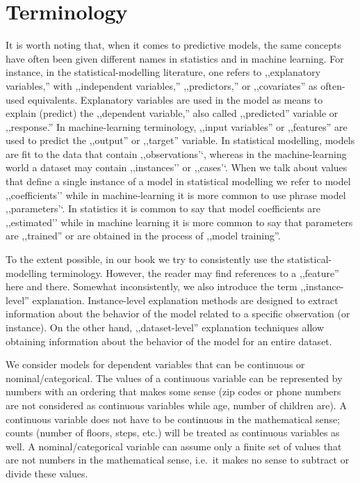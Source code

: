 \documentclass[]{krantz}
\begin{document}
\hypertarget{terminology}{%
\section{Terminology}\label{terminology}}

It is worth noting that, when it comes to predictive models, the same concepts have often been given different names in statistics and in machine learning. For instance, in the statistical-modelling literature, one refers to ,,explanatory variables,'' with ,,independent variables,'' ,,predictors,'' or ,,covariates'' as often-used equivalents. Explanatory variables are used in the model as means to explain (predict) the ,,dependent variable,'' also called ,,predicted'' variable or ,,response.'' In machine-learning terminology, ,,input variables'' or ,,features'' are used to predict the ,,output'' or ,,target'' variable. In statistical modelling, models are fit to the data that contain ,,observations'`, whereas in the machine-learning world a dataset may contain ,,instances'' or ,,cases'`. When we talk about values that define a single instance of a model in statistical modelling we refer to model ,,coefficients'' while in machine-learning it is more common to use phrase model ,,parameters'`. In statistics it is common to say that model coefficients are ,,estimated'' while in machine learning it is more common to say that parameters are ,,trained'' or are obtained in the process of ,,model training''.

To the extent possible, in our book we try to consistently use the statistical-modelling terminology. However, the reader may find references to a ,,feature'' here and there. Somewhat inconsistently, we also introduce the term ,,instance-level'' explanation. Instance-level explanation methods are designed to extract information about the behavior of the model related to a specific observation (or instance). On the other hand, ,,dataset-level'' explanation techniques allow obtaining information about the behavior of the model for an entire dataset.

We consider models for dependent variables that can be continuous or nominal/categorical. The values of a continuous variable can be represented by numbers with an ordering that makes some sense (zip codes or phone numbers are not considered as continuous variables while age, number of children are). A continuous variable does not have to be continuous in the mathematical sense; counts (number of floors, steps, etc.) will be treated as continuous variables as well. A nominal/categorical variable can assume only a finite set of values that are not numbers in the mathematical sense, i.e.~it makes no sense to subtract or divide these values.
\end{document}

